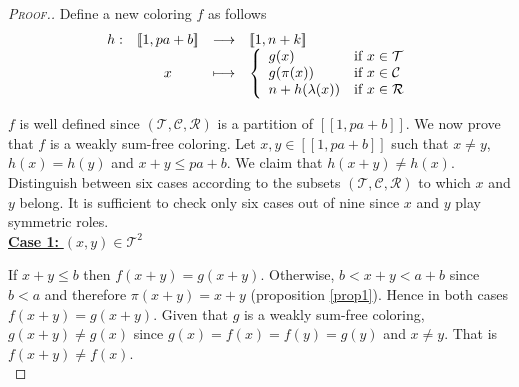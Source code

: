 \begin{proof}[\textsc{Proof.}]
Define a new coloring \(f\) as follows
\[
\begin{array}{c c c l}
	h : & [\![1, p a + b]\!] & \longrightarrow & [\![1,n+k]\!] \\
	& x & \longmapsto & 
	\left\{ \begin{array}{l l}
		g(x) & \text{if}~x \in \mathcal{T} \\
		g(\pi(x)) & \text{if}~x \in \mathcal{C} \\
		n + h(\lambda(x)) & \text{if}~x \in \mathcal{R}
	\end{array} \right.
\end{array}
\]

\(f\) is well defined since \((\mathcal{T}, \mathcal{C}, \mathcal{R})\) is a partition of  \([\![1, p a + b]\!]\). 
We now prove that \(f\) is a weakly sum-free coloring. Let \(x,y \in [\![1, p a + b]\!]\) such that \(x \neq y\), 
\(h(x) = h(y)\) and \(x+y \leqslant p a+ b\). We claim that \(h(x+y) \neq h(x)\). Distinguish between six cases 
according to the subsets \((\mathcal{T}, \mathcal{C}, \mathcal{R})\) to which \(x\) and \(y\) belong. It is 
sufficient to check only six cases out of nine since \(x\) and \(y\) play symmetric roles. \\

\noindent \underline{\textbf{Case 1:} \((x,y) \in \mathcal{T}^2\)}
\par
If \(x + y \leqslant b\) then \(f(x+y)=g(x+y)\). Otherwise, \(b < x+y < a+b\) since \(b < a\) and 
therefore \(\pi(x + y) = x +y\) (proposition \ref{prop1}). Hence in both cases \(f(x+y)=g(x+y)\). Given that 
\(g\) is a weakly sum-free coloring, \(g(x + y) \neq g(x)\) since \(g(x)=f(x)=f(y)=g(y)\) and \(x \neq y \). That 
is \(f(x + y) \neq f(x)\). \\


\end{proof}
